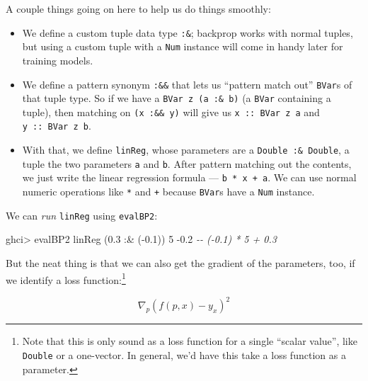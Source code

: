 \documentclass[]{article}
\newenvironment{Shaded}{}{}
\newcommand{\CommentTok}[1]{\textcolor[rgb]{0.38,0.63,0.69}{\textit{#1}}}
\newcommand{\DecValTok}[1]{\textcolor[rgb]{0.25,0.63,0.44}{#1}}
\newcommand{\FloatTok}[1]{\textcolor[rgb]{0.25,0.63,0.44}{#1}}
\newcommand{\NormalTok}[1]{#1}
\newcommand{\OperatorTok}[1]{\textcolor[rgb]{0.40,0.40,0.40}{#1}}
\begin{document}
A couple things going on here to help us do things smoothly:

\begin{itemize}
\item
  We define a custom tuple data type \texttt{:\&}; backprop works with normal
  tuples, but using a custom tuple with a \texttt{Num} instance will come in
  handy later for training models.
\item
  We define a pattern synonym \texttt{:\&\&} that lets us ``pattern match out''
  \texttt{BVar}s of that tuple type. So if we have a
  \texttt{BVar\ z\ (a\ :\&\ b)} (a \texttt{BVar} containing a tuple), then
  matching on \texttt{(x\ :\&\&\ y)} will give us \texttt{x\ ::\ BVar\ z\ a} and
  \texttt{y\ ::\ BVar\ z\ b}.
\item
  With that, we define \texttt{linReg}, whose parameters are a
  \texttt{Double\ :\&\ Double}, a tuple the two parameters \texttt{a} and
  \texttt{b}. After pattern matching out the contents, we just write the linear
  regression formula --- \texttt{b\ *\ x\ +\ a}. We can use normal numeric
  operations like \texttt{*} and \texttt{+} because \texttt{BVar}s have a
  \texttt{Num} instance.
\end{itemize}

We can \emph{run} \texttt{linReg} using \texttt{evalBP2}:

\begin{Shaded}
\begin{Highlighting}[]
\NormalTok{ghci}\OperatorTok{>}\NormalTok{ evalBP2 linReg (}\FloatTok{0.3} \OperatorTok{:\&}\NormalTok{ (}\OperatorTok{{-}}\FloatTok{0.1}\NormalTok{)) }\DecValTok{5}
\OperatorTok{{-}}\FloatTok{0.2}        \CommentTok{{-}{-} ({-}0.1) * 5 + 0.3}
\end{Highlighting}
\end{Shaded}

But the neat thing is that we can also get the gradient of the parameters, too,
if we identify a loss function:\footnote{Note that this is only sound as a loss
  function for a single ``scalar value'', like \texttt{Double} or a one-vector.
  In general, we'd have this take a loss function as a parameter.}

\[
\nabla_p (f(p, x) - y_x)^2
\]
\end{document}
